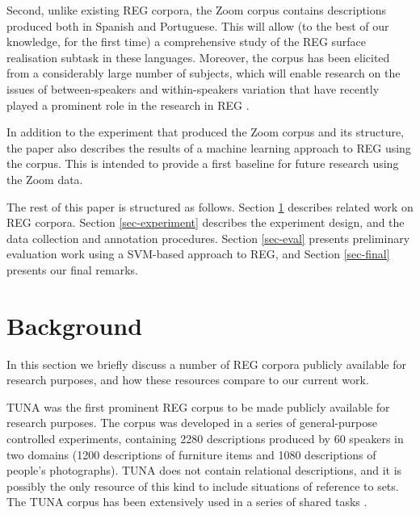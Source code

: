 \documentclass{article}
\begin{document}
Second, unlike existing REG corpora, the Zoom corpus contains descriptions produced both in Spanish and Portuguese. This will allow (to the best of our knowledge, for the first time) a comprehensive study of the REG surface realisation subtask in these languages. Moreover, the corpus has been elicited from a considerably large number of subjects, which will enable research on the issues of between-speakers and within-speakers variation that have recently played a prominent role in the research in REG \cite{trainable-speaker,romina-coling,non-det}.

In addition to the experiment that produced the Zoom corpus and its structure, the paper also describes the results of a machine learning approach to REG using the corpus. This is intended to provide a first baseline for future research using the Zoom data.

The rest of this paper is structured as follows. Section \ref{sec-background} describes related work on REG corpora. Section \ref{sec-experiment} describes the experiment design, and the data collection and annotation procedures. Section \ref{sec-eval} presents preliminary evaluation work using a SVM-based approach to REG, and Section \ref{sec-final} presents our final remarks.



\section{Background}
\label{sec-background}

In this section we briefly discuss a number of REG corpora publicly available for research purposes, and how these resources compare to our current work.

TUNA \cite{tuna-corpus} was the first prominent REG corpus to be made publicly available for research purposes. The corpus was developed in a series of general-purpose controlled experiments, containing 2280 descriptions produced by 60 speakers in two domains (1200 descriptions of furniture items and 1080 descriptions of people's photographs). TUNA does not contain relational descriptions, and it is possibly the only resource of this kind to include situations of reference to sets. The TUNA corpus has been extensively used in a series of shared tasks \cite{reg2009}.
\end{document}
